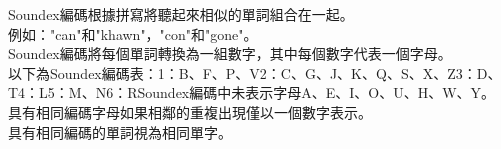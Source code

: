 Soundex編碼根據拼寫將聽起來相似的單詞組合在一起。\\
例如："can"和"khawn"，"con"和"gone"。\\
Soundex編碼將每個單詞轉換為一組數字，其中每個數字代表一個字母。\\
以下為Soundex編碼表：1：B、F、P、V2：C、G、J、K、Q、S、X、Z3：D、T4：L5：M、N6：RSoundex編碼中未表示字母A、E、I、O、U、H、W、Y。\\
具有相同編碼字母如果相鄰的重複出現僅以一個數字表示。\\
具有相同編碼的單詞視為相同單字。\\
